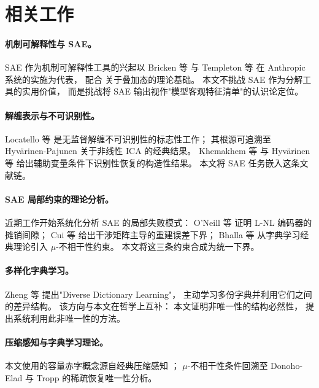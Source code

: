 \documentclass[11pt,a4paper]{article}
\theoremstyle{remark}
\begin{document}
\section{相关工作}\label{sec:related}

\paragraph{机制可解释性与 SAE。}
SAE 作为机制可解释性工具的兴起以 Bricken 等 \cite{bricken2023}
与 Templeton 等 \cite{templeton2024} 在 Anthropic 系统的实施为代表，
配合 \cite{elhage2022} 关于叠加态的理论基础。
本文不挑战 SAE 作为分解工具的实用价值，
而是挑战将 SAE 输出视作"模型客观特征清单"的认识论定位。

\paragraph{解缠表示与不可识别性。}
Locatello 等 \cite{locatello2019} 是无监督解缠不可识别性的标志性工作；
其根源可追溯至 Hyvärinen-Pajunen \cite{hyvarinen1999} 关于非线性 ICA 的经典结果。
Khemakhem 等 \cite{khemakhem2020} 与 Hyvärinen 等 \cite{hyvarinen2019time}
给出辅助变量条件下识别性恢复的构造性结果。
本文将 SAE 任务嵌入这条文献链。

\paragraph{SAE 局部约束的理论分析。}
近期工作开始系统化分析 SAE 的局部失败模式：
O'Neill 等 \cite{oneill2024} 证明 L-NL 编码器的摊销间隙；
Cui 等 \cite{cui2026} 给出干涉矩阵主导的重建误差下界；
Bhalla 等 \cite{bhalla2026} 从字典学习经典理论引入 $\mu$-不相干性约束。
本文将这三条约束合成为统一下界。

\paragraph{多样化字典学习。}
Zheng 等 \cite{zheng2026} 提出"Diverse Dictionary Learning"，
主动学习多份字典并利用它们之间的差异结构。
该方向与本文在哲学上互补：
本文证明非唯一性的结构必然性，\cite{zheng2026} 提出系统利用此非唯一性的方法。

\paragraph{压缩感知与字典学习理论。}
本文使用的容量赤字概念源自经典压缩感知 \cite{candes2006compressive,candes2008restricted}；
$\mu$-不相干性条件回溯至 Donoho-Elad \cite{donoho2003optimally}
与 Tropp \cite{tropp2004greed} 的稀疏恢复唯一性分析。
\end{document}

